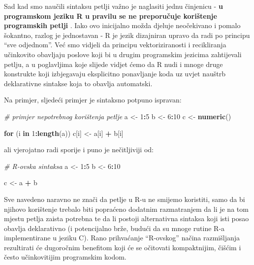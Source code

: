 \documentclass[]{book}
\newenvironment{Shaded}{\begin{snugshade}}{\end{snugshade}}
\newcommand{\KeywordTok}[1]{\textcolor[rgb]{0.13,0.29,0.53}{\textbf{#1}}}
\newcommand{\DecValTok}[1]{\textcolor[rgb]{0.00,0.00,0.81}{#1}}
\newcommand{\StringTok}[1]{\textcolor[rgb]{0.31,0.60,0.02}{#1}}
\newcommand{\CommentTok}[1]{\textcolor[rgb]{0.56,0.35,0.01}{\textit{#1}}}
\newcommand{\ControlFlowTok}[1]{\textcolor[rgb]{0.13,0.29,0.53}{\textbf{#1}}}
\newcommand{\OperatorTok}[1]{\textcolor[rgb]{0.81,0.36,0.00}{\textbf{#1}}}
\newcommand{\NormalTok}[1]{#1}
\theoremstyle{definition}
\theoremstyle{definition}
\theoremstyle{definition}
\theoremstyle{remark}
\begin{document}
Sad kad smo naučili sintaksu petlji važno je naglasiti jednu činjenicu -
\textbf{u programskom jeziku R u pravilu se ne preporučuje korištenje
programskih petlji} . Iako ovo inicijalno možda djeluje neočekivano i
pomalo šokantno, razlog je jednostavan - R je jezik dizajniran upravo da
radi po principu ``sve odjednom''. Već smo vidjeli da principu
vektoriziranosti i recikliranja učinkovito obavljaju poslove koji bi u
drugim programskim jezicima zahtijevali petlju, a u poglavljima koje
slijede vidjet ćemo da R nudi i mnoge druge konstrukte koji izbjegavaju
eksplicitno ponavljanje koda uz uvjet nauštrb deklarativne sintakse koja
to obavlja automatski.

Na primjer, sljedeći primjer je sintaksno potpuno ispravan:

\begin{Shaded}
\begin{Highlighting}[]
\CommentTok{# primjer nepotrebnog korištenja petlje}
\NormalTok{a <-}\StringTok{ }\DecValTok{1}\OperatorTok{:}\DecValTok{5}
\NormalTok{b <-}\StringTok{ }\DecValTok{6}\OperatorTok{:}\DecValTok{10}
\NormalTok{c <-}\StringTok{ }\KeywordTok{numeric}\NormalTok{()}

\ControlFlowTok{for}\NormalTok{ (i }\ControlFlowTok{in} \DecValTok{1}\OperatorTok{:}\KeywordTok{length}\NormalTok{(a)) c[i] <-}\StringTok{ }\NormalTok{a[i] }\OperatorTok{+}\StringTok{ }\NormalTok{b[i]}
\end{Highlighting}
\end{Shaded}

ali vjerojatno radi sporije i puno je nečitljiviji od:

\begin{Shaded}
\begin{Highlighting}[]
\CommentTok{# R-ovska sintaksa}
\NormalTok{a <-}\StringTok{ }\DecValTok{1}\OperatorTok{:}\DecValTok{5}
\NormalTok{b <-}\StringTok{ }\DecValTok{6}\OperatorTok{:}\DecValTok{10}

\NormalTok{c <-}\StringTok{ }\NormalTok{a }\OperatorTok{+}\StringTok{ }\NormalTok{b}
\end{Highlighting}
\end{Shaded}

Sve navedeno naravno ne znači da petlje u R-u ne smijemo koristiti, samo
da bi njihovo korištenje trebalo biti popraćeno dodatnim razmatranjem da
li je na tom mjestu petlja zaista potrebna te da li postoji alternativna
sintaksa koji isti posao obavlja deklarativno (i potencijalno brže,
budući da su mnoge rutine R-a implementirane u jeziku C). Rano
prihvaćanje ``R-ovskog'' načina razmišljanja rezultirati će dugoročnim
benefitom koji će se očitovati kompaktnijim, čišćim i često
učinkovitijim programskim kodom.
\end{document}
